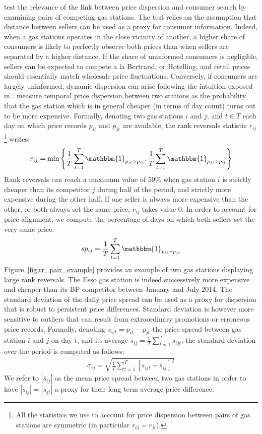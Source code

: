 \documentclass[english]{article}
\begin{document}
\cite{TAP11} test the relevance of the link between price dispersion and consumer search by examining pairs of competing gas stations. The test relies on the assumption that distance between sellers can be used as a proxy for consumer information. Indeed, when a gas stations operates in the close vicinity of another, a higher share of consumers is likely to perfectly observe both prices than when sellers are separated by a higher distance. If the share of uninformed consumers is negligible, sellers can be expected to compete a la Bertrand, or Hotelling, and retail prices should essentially match wholesale price fluctuations. Conversely, if consumers are largely uninformed, dynamic dispersion can arise following the intuition exposed in \cite{VAR80}. \cite{TAP11} measure temporal price dispersion between two stations as the probability that the gas station which is in general cheaper (in terms of day count) turns out to be more expensive. Formally, denoting two gas stations $i$ and $j$, and $t \in T$ each day on which price records $p_{it}$ and $p_{jt}$ are available, the rank reversals statistic $r_{ij}$%
\footnote{All the statistics we use to account for price dispersion between pairs of gas stations are symmetric (in particular $r_{ij} = r_{ji}$).}%
writes:
\begin{align*}
r_{ij} = \min\left\{\frac{1}{T} \sum_{t=1}^{T} \mathbbm{1}_{p_{it} > p_{jt}}, \frac{1}{T} \sum_{t=1}^{T} \mathbbm{1}_{p_{jt} > p_{it}}\right\}
\end{align*}
Rank reversals can reach a maximum value of 50\% when gas station $i$ is strictly cheaper than its competitor $j$ during half of the period, and strictly more expensive during the other half. If one seller is always more expensive than the other, or both always set the same price, $r_{ij}$ takes value 0. In order to account for price alignment, we compute the percentage of days on which both sellers set the very same price:
\begin{align*}
sp_{ij} = \frac{1}{T} \sum_{t=1}^{T} \mathbbm{1}_{p_{it} = p_{jt}}
\end{align*}
Figure~\ref{fig:rr_pair_example} provides an example of two gas stations displaying large rank reversals. The Esso gas station is indeed successively more expensive and cheaper than its BP competitor between January and July 2014. The standard deviation of the daily price spread can be used as a proxy for dispersion that is robust to persistent price differences. Standard deviation is however more sensitive to outliers that can result from extraordinary promotions or erroneous price records. Formally, denoting $s_{ijt} = p_{it} - p_{jt}$ the price spread between gas station $i$ and $j$ on day $t$, and its average $\bar{s}_{ij} = \frac{1}{T} \sum_{t=1}^{T} s_{ijt}$, the standard deviation over the period is computed as follows:
\begin{align*}
\sigma_{ij} = \sqrt{\frac{1}{T} \sum_{t=1}^{T} [s_{ijt} - \bar{s}_{ij}]^2}
\end{align*}
We refer to $|\bar{s}_{ij}|$ as the mean price spread between two gas stations in order to have $|\bar{s}_{ij}|=|\bar{s}_{ji}|$ a proxy for their long term average price difference.
\end{document}
